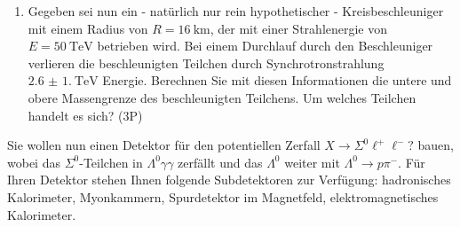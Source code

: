 \begin{enumerate}
  \item Gegeben sei nun ein - natürlich nur rein hypothetischer - Kreisbeschleuniger mit einem Radius von $R = \SI{16}{\kilo \metre}$, der mit einer Strahlenergie von $E =\SI{50}{\tera \electronvolt}$ betrieben wird. Bei einem Durchlauf durch den Beschleuniger verlieren die beschleunigten Teilchen durch Synchrotronstrahlung $\SI{2.6(1.0)}{\tera \electronvolt}$ Energie. Berechnen Sie mit diesen Informationen die untere und obere Massengrenze des beschleunigten Teilchens. Um welches Teilchen handelt es sich? (3P) 
\end{enumerate}
Sie wollen nun einen Detektor für den potentiellen Zerfall $X\rightarrow \Sigma^0 \ell^+ \ell^-?$ bauen, wobei das $\Sigma^0$-Teilchen in $\Lambda^0 \gamma\gamma$ zerfällt und das $\Lambda^0$ weiter mit $\Lambda^0\rightarrow p\pi^-$. Für Ihren Detektor stehen Ihnen folgende Subdetektoren zur Verfügung: hadronisches Kalorimeter, Myonkammern, Spurdetektor im Magnetfeld, elektromagnetisches Kalorimeter.
